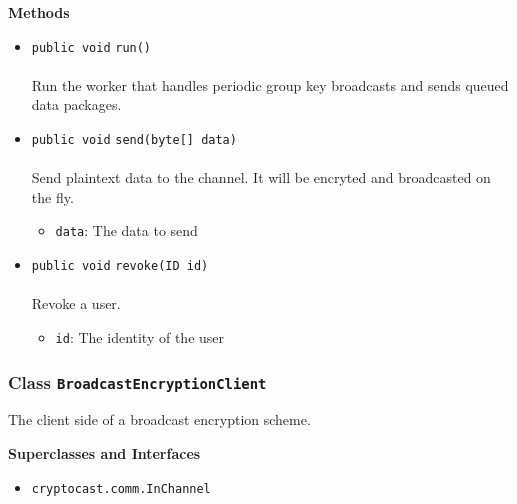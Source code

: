 \textbf{\sffamily Methods}
\begin{itemize}
\item \lstinline|public void| \lstinline|run|\lstinline|()|\\ \\[-0.6em]
Run the worker that handles periodic group key broadcasts and sends
 queued data packages.



\item \lstinline|public void| \lstinline|send|\lstinline|(byte[] data)|\\ \\[-0.6em]
Send plaintext data to the channel. It will be encryted and broadcasted
 on the fly.
\begin{itemize}
\item \lstinline|data|: The data to send
\end{itemize}



\item \lstinline|public void| \lstinline|revoke|\lstinline|(ID id)|\\ \\[-0.6em]
Revoke a user.
\begin{itemize}
\item \lstinline|id|: The identity of the user
\end{itemize}



\end{itemize}

\subsubsection{Class \lstinline|BroadcastEncryptionClient|}
The client side of a broadcast encryption scheme. \\
\noindent\begin{minipage}[t]{5cm}
\vspace{0.3em}
\hspace*{2em}
\vspace{0.3em}
\end{minipage}



\textbf{\sffamily Superclasses and Interfaces}
\begin{itemize}
\item \lstinline|cryptocast.comm.InChannel|
\end{itemize}


